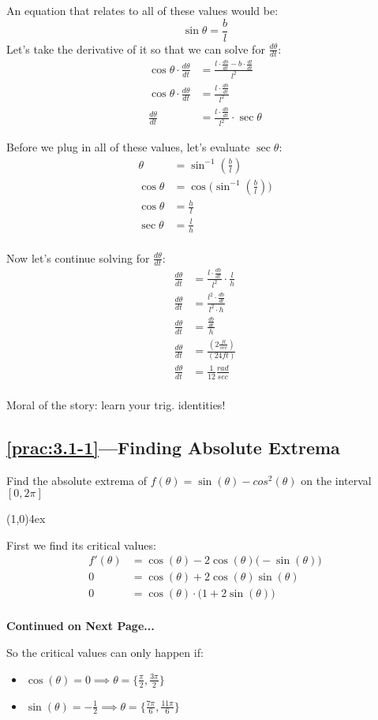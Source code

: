 \documentclass{MathNotes}
\newcommand{\br}{
\begin{center}
\line(1,0){4ex}
\end{center}}
\newcommand{\continued}{
\mbox{}
\vfill
\textbf{Continued on Next Page...}\newpage
}
\begin{document}
An equation that relates to all of these values would be:
$$\sin\theta=\frac{b}{l}$$
Let's take the derivative of it so that we can solve for $\frac{d\theta}{dt}$:
\begin{align*}
    \cos\theta\cdot\frac{d\theta}{dt}&=\frac{l\cdot\frac{db}{dt}-b\cdot\frac{dl}{dt}}{l^2}\\
    \cos\theta\cdot\frac{d\theta}{dt}&=\frac{l\cdot\frac{db}{dt}}{l^2}\\
    \frac{d\theta}{dt}&=\frac{l\cdot\frac{db}{dt}}{l^2}\cdot\sec\theta
\end{align*}

Before we plug in all of these values, let's evaluate $\sec\theta$:
\begin{align*}
    \theta&=\sin^{-1}(\frac{b}{l})\\
    \cos\theta&=\cos\big(\sin^{-1}(\frac{b}{l})\big)\\
    \cos\theta&=\frac{h}{l}\\
    \sec\theta&=\frac{l}{h}\\
\end{align*}

Now let's continue solving for $\frac{d\theta}{dt}$:
\begin{align*}
    \frac{d\theta}{dt}&=\frac{l\cdot\frac{db}{dt}}{l^2}\cdot\frac{l}{h}\\
    \frac{d\theta}{dt}&=\frac{l^2\cdot\frac{db}{dt}}{l^2\cdot h}\\
    \frac{d\theta}{dt}&=\frac{\frac{db}{dt}}{h}\\
    \frac{d\theta}{dt}&=\frac{(2\frac{ft}{sec})}{(24ft)}\\
    \frac{d\theta}{dt}&=\frac{1}{12}\frac{rad}{sec}\\
\end{align*}

Moral of the story: learn your trig. identities!
\subsection*{\ref{prac:3.1-1}---Finding Absolute Extrema}\label{ans:3.1-1}
Find the absolute extrema of $f(\theta)=\sin(\theta)-cos^2(\theta)$ on
the interval $[0, 2\pi]$
\br
First we find its critical values:
\begin{align*}
    f'(\theta)&=\cos(\theta)-2\cos(\theta)\big(-\sin(\theta)\big)\\
    0&=\cos(\theta)+2\cos(\theta)\sin(\theta)\\
    0&=\cos(\theta)\cdot\big(1+2\sin(\theta)\big)\\
\end{align*}
\continued
So the critical values can only happen if:
\begin{multicols}{2}
    \begin{itemize}
        \item $\cos(\theta)=0\implies\theta=\{\frac{\pi}{2}, \frac{3\pi}{2}\}$
        \item $\sin(\theta)=-\frac{1}{2}\implies\theta=\{\frac{7\pi}{6},
            \frac{11\pi}{6}\}$
    \end{itemize}
\end{multicols}
\end{document}
